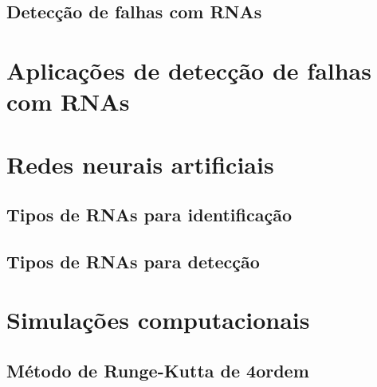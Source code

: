 \subsection{Detecção de falhas com RNAs}

\section{Aplicações de detecção de falhas com RNAs}

\section{Redes neurais artificiais}

\subsection{Tipos de RNAs para identificação}

\subsection{Tipos de RNAs para detecção}

\section{Simulações computacionais}

\subsection{Método de Runge-Kutta de 4\textordfeminine ordem}
